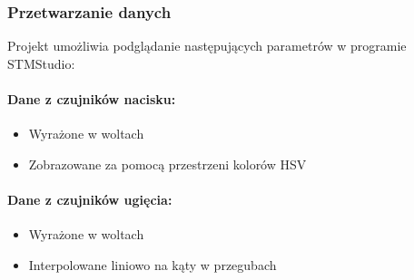 \documentclass[12pt,a4paper]{article}
\begin{document}
\subsubsection{Przetwarzanie danych}
Projekt umożliwia podglądanie następujących parametrów w programie STMStudio:
\paragraph{Dane z czujników nacisku:}
\begin{itemize}
\item Wyrażone w woltach
\item Zobrazowane za pomocą przestrzeni kolorów HSV
\end{itemize}
\paragraph{Dane z czujników ugięcia:}
\begin{itemize}
\item Wyrażone w woltach
\item Interpolowane liniowo na kąty w przegubach
\end{itemize}
\end{document}
